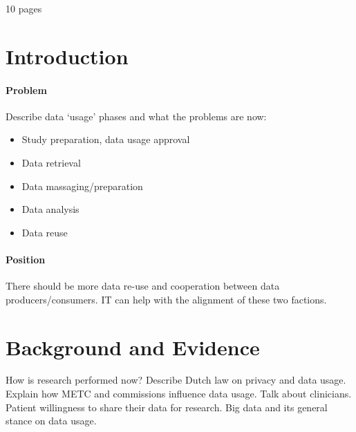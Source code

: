 10 pages

\section{Introduction}
\paragraph{Problem}
Describe data `usage' phases and what the problems are now:
\begin{itemize}
	\item Study preparation, data usage approval
	\item Data retrieval
	\item Data massaging/preparation
	\item Data analysis
	\item Data reuse
\end{itemize}
\paragraph{Position}
There should be more data re-use and cooperation between data producers/consumers.
IT can help with the alignment of these two factions.

\section{Background and Evidence}
How is research performed now?
Describe Dutch law on privacy and data usage.
Explain how METC and commissions influence data usage.
Talk about clinicians.
Patient willingness to share their data for research.
Big data and its general stance on data usage.

